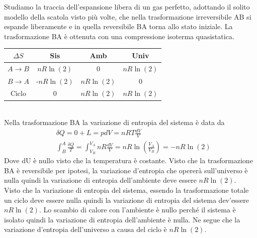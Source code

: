 \documentclass[
10pt, %
a4paper, %
oneside, %
headinclude,footinclude, %
BCOR5mm, %
]{scrartcl}
\begin{document}
\begin{exercise}
	Studiamo la traccia dell'espansione libera di un gas perfetto, adottando il solito modello della scatola visto più volte, che nella trasformazione irreversibile AB si espande liberamente e in quella reversibile BA torna allo stato iniziale. La trasformazione BA è ottenuta con una compressione isoterma quasistatica. 
	\begin{table}[h!]
		\begin{center}
			\begin{tabular}{ || c| c | c| c|| }
				\hline
				\(\Delta S\) & Sis& Amb& Univ\\
				\hline
				\(A\rightarrow B\)& \(nR\ln(2)\)   &0  &\(nR\ln(2)\)  \\
				\(B\rightarrow A\)& -\(nR\ln(2)\)    &\(nR\ln(2)\)   &0\\
				\hline
				Ciclo         & 0    &\(nR\ln(2)\) &\(nR\ln(2)\) \\
				\hline
			\end{tabular}
		\end{center}
	\end{table}\\
	Nella trasformazione BA la variazione di entropia del sistema è data da 
	\begin{align*}
		&\delta Q = 0+L = pdV=nRT\frac{dV}{V}\\
		&\int_{B}^{A}\frac{\delta Q}{T} = \int_{V_B}^{V_A}nR\frac{dV}{V} = nR\ln\left(\frac{V_A}{V_B}\right) =-nR\ln(2)
	\end{align*}
	Dove dU è nullo visto che la temperatura è costante. Visto che la trasformazione BA è reversibile per ipotesi, la variazione d'entropia che opererà sull'universo è nulla quindi la variazione di entropia dell'ambiente deve essere \(nR\ln(2)\).\\
	Visto che la variazione di entropia del sistema, essendo la trasformazione totale un ciclo deve essere nulla quindi la variazione di entropia del sistema dev'essere \(nR\ln(2)\). Lo scambio di calore con l'ambiente è nullo perché il sistema è isolato quindi la variazione di entropia dell'ambiente è nulla. Ne segue che la variazione d'entropia dell'universo a causa del ciclo è \(nR\ln(2)\).
\end{exercise}
\end{document}
